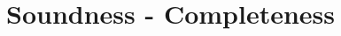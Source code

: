 \section{Soundness - Completeness}
\begin{comment}
\section{Over-Approximation Theory Refinement}
\label{sec:soundness}

From now on, We focus on a \emph{polynomial inequality} such that 
$I_i$ and $\psi_j(x_1,\cdots,x_n)$ are an open interval $(a_i,b_i)$ and 
an atomic polynomial inequaltiy (API) $f_j > 0$, respectively. 
We denote $\mathbb{S}(f_j) = \{x \in \Real^n \mid f_j > 0 ~\text{holds}\}$.

For ICP, it is folklore that, for polynomial inequality 
$\exists x_1 \in (a_1,b_1) \cdots x_n \in (a_n,b_n) . \wedge_{i} f_i > 0$, 
\begin{itemize}
\item if $\exists x_1 \in (a_1,b_1) \cdots x_n \in (a_n,b_n) . \wedge_{i} f_i > 0$ is SAT, 
ICP eventually detects it, and 
\item if $\exists x_1 \in [a_1,b_1] \cdots x_n \in [a_n,b_n] . \wedge_{i} f_i \geq 0$ is UNSAT, 
ICP eventually detects it, 
\end{itemize}
under the assumptions of {\em fair} decomposition and bounded intervals $(a_i,b_i)$. 
We will prepare terminology and briefly review this fact. 

\suppress{
\begin{definition} \label{def:poly}
A polynomial inequality is a bounded quantification 
$\exists x_1 \in I_1 \cdots x_n \in I_n. \psi(x_1,\cdots,x_n)$ 
such that 
\begin{itemize}
\item each $I_i$ is an open interval $x_i \in (a_i,b_i)$, and 
\item $\psi(x_1,\cdots,x_n)$ is a conjunction of $f_j > 0$ 
where $f_j$ is a polynomial over $\{x_1, \cdots, x_n\}$. 
\end{itemize}
$f_i > 0$ is called an atomic polynomial inequality (API). 
We denote $\mathbb{S}(F) = \{x \in \Real^n \mid F ~\text{holds}\}$.
\end{definition}

\begin{example} \label{examp:poly_ieq}
$\exists x \in (-1,3)~y \in (2,4) . (x^3y - y^4 > 0) \wedge (y^3 -xy >0)$
is an example of a polynomial inequality with 2 variables and 2 APIs. 
\end{example}
}


\end{comment}

